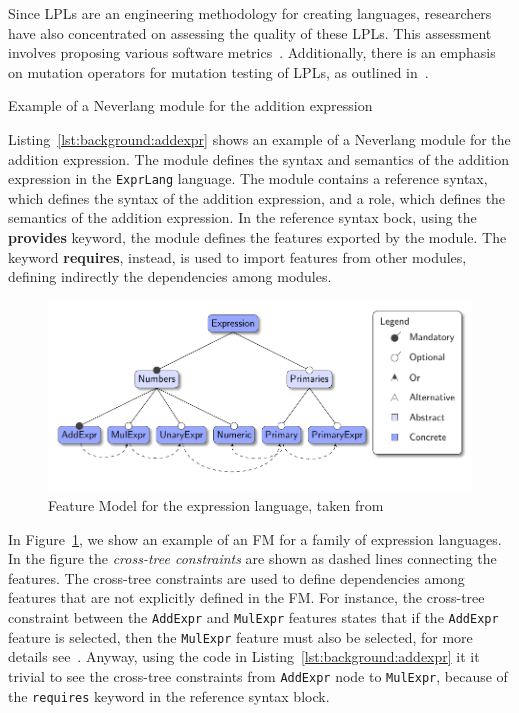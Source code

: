 Since LPLs are an engineering methodology for creating languages, researchers have also concentrated on assessing the quality of these LPLs. This assessment involves proposing various software metrics~\cite{Cazzola21b}. Additionally, there is an emphasis on mutation operators for mutation testing of LPLs, as outlined in~\cite{Cazzola22b}.

\begin{Listing}[t]
    \centering
    \caption{Example of a Neverlang module for the addition expression}
    \label{lst:background:addexpr}
\end{Listing}

Listing~\ref{lst:background:addexpr} shows an example of a Neverlang module for the addition expression. The module defines the syntax and semantics of the addition expression in the \texttt{ExprLang} language. The module contains a reference syntax, which defines the syntax of the addition expression, and a role, which defines the semantics of the addition expression.
In the reference syntax bock, using the \textbf{provides} keyword, the module defines the features exported by the module. The keyword \textbf{requires}, instead, is used to import features from other modules, defining indirectly the dependencies among modules.

\begin{figure}[t]
    \centering
    \includegraphics[width=0.9\linewidth]{figs/background/expression_featuremodel.pdf}
    \caption{Feature Model for the expression language, taken from \cite{Cazzola15f}}
    \label{lst:background:exprfeaturemodel}
\end{figure}

In Figure~\ref{lst:background:exprfeaturemodel}, we show an example of an FM for a family of expression languages. In the figure the \textit{cross-tree constraints} are shown as dashed lines connecting the features. The cross-tree constraints are used to define dependencies among features that are not explicitly defined in the FM. For instance, the cross-tree constraint between the \texttt{AddExpr} and \texttt{MulExpr} features states that if the \texttt{AddExpr} feature is selected, then the \texttt{MulExpr} feature must also be selected, for more details see~\cite{Cazzola15f}.
Anyway, using the code in Listing~\ref{lst:background:addexpr} it it trivial to see the cross-tree constraints from \texttt{AddExpr} node to \texttt{MulExpr}, because of the \texttt{requires} keyword in the reference syntax block.
